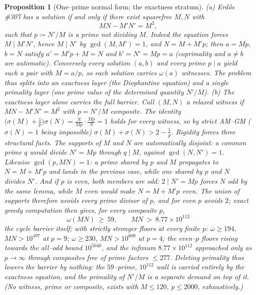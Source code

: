 \documentclass[11pt]{article}
\newtheorem{proposition}[theorem]{Proposition}
\theoremstyle{definition}
\begin{document}
\begin{proposition}[One--prime normal form; the exactness stratum]\label{prop:oneprime}
\textup{(a)} Erd\H{o}s \#307 has a solution if and only if there exist squarefree $M,N$ with
\[ MN-M'N'=M^2, \]
such that $p\coloneqq N'/M$ is a prime not dividing $M$. Indeed the equation forces $M\mid M'N'$, hence
$M\mid N'$ by $\gcd(M,M')=1$, and $N=M+M'p$; then $a=Mp$, $b=N$ satisfy $a'=M'p+M=N$ and $b'=N'=Mp=a$
(coprimality and $a\ne b$ are automatic). Conversely every solution $(a,b)$ and every prime $p\mid a$
yield such a pair with $M=a/p$, so each solution carries $\omega(a)$ witnesses. The problem thus splits
into an \emph{exactness} layer (the Diophantine equation) and a single \emph{primality} layer (one prime
value of the determined quantity $N'/M$).
\textup{(b)} \emph{The exactness layer alone carries the full barrier.} Call $(M,N)$ a \emph{relaxed
witness} if $MN-M'N'=M^2$ with $p=N'/M$ composite. The identity
$\bigl(\sigma(M)+\tfrac1p\bigr)\sigma(N)=\frac{N}{Mp}\cdot\frac{Mp}{N}=1$ holds for \emph{every} witness,
so by strict AM--GM ($\sigma(N)=1$ being impossible) $\sigma(M)+\sigma(N)>2-\tfrac1p$. Rigidity forces
three structural facts. The supports of $M$ and $N$ are \emph{automatically} disjoint: a common prime
$q$ would divide $N'=Mp$ through $q\mid M$, against $\gcd(N,N')=1$. Likewise $\gcd(p,MN)=1$: a prime
shared by $p$ and $M$ propagates to $N=M+M'p$ and lands in the previous case, while one shared by $p$
and $N$ divides $N'$. And if $p$ is even, both members are odd: $2\mid N'=Mp$ forces $N$ odd by the same
lemma, while $M$ even would make $N=M+M'p$ even. The union of supports therefore avoids every prime
divisor of $p$, and for even $p$ avoids $2$; exact greedy computation then gives, for \emph{every}
composite $p$,
\[ \omega(MN)\ \ge\ 59, \qquad MN\ >\ 8.77\times10^{112} \]
the cycle barrier itself; with strictly stronger floors at every finite $p$: $\omega\ge194$,
$MN>10^{497}$ at $p=9$; $\omega\ge230$, $MN>10^{609}$ at $p=4$; the even--$p$ floors rising towards the
all--odd bound $10^{5040}$, and the infimum $8.77\times10^{112}$ approached only as $p\to\infty$ through
composites free of prime factors $\le277$. Deleting primality thus lowers the barrier by
\emph{nothing}: the $59$--prime, $10^{112}$ wall is carried entirely by the exactness equation, and the
primality of $N'/M$ is a separate demand on top of it. (No witness, prime or composite, exists with
$M\le120$, $p\le2000$, exhaustively.)
\end{proposition}
\end{document}
